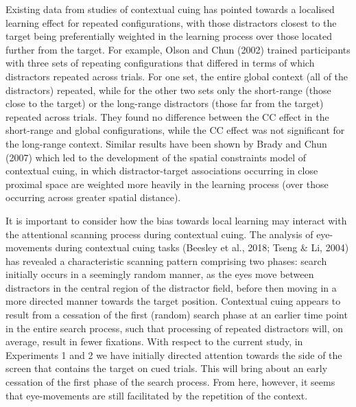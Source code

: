\documentclass[
  man,floatsintext]{apa7}
\begin{document}
Existing data from studies of contextual cuing has pointed towards a localised learning effect for repeated configurations, with those distractors closest to the target being preferentially weighted in the learning process over those located further from the target. For example, Olson and Chun (2002) trained participants with three sets of repeating configurations that differed in terms of which distractors repeated across trials. For one set, the entire global context (all of the distractors) repeated, while for the other two sets only the short-range (those close to the target) or the long-range distractors (those far from the target) repeated across trials. They found no difference between the CC effect in the short-range and global configurations, while the CC effect was not significant for the long-range context. Similar results have been shown by Brady and Chun (2007) which led to the development of the spatial constraints model of contextual cuing, in which distractor-target associations occurring in close proximal space are weighted more heavily in the learning process (over those occurring across greater spatial distance).

It is important to consider how the bias towards local learning may interact with the attentional scanning process during contextual cuing. The analysis of eye-movements during contextual cuing tasks (Beesley et al., 2018; Tseng \& Li, 2004) has revealed a characteristic scanning pattern comprising two phases: search initially occurs in a seemingly random manner, as the eyes move between distractors in the central region of the distractor field, before then moving in a more directed manner towards the target position. Contextual cuing appears to result from a cessation of the first (random) search phase at an earlier time point in the entire search process, such that processing of repeated distractors will, on average, result in fewer fixations. With respect to the current study, in Experiments 1 and 2 we have initially directed attention towards the side of the screen that contains the target on cued trials. This will bring about an early cessation of the first phase of the search process. From here, however, it seems that eye-movements are still facilitated by the repetition of the context.
\end{document}
